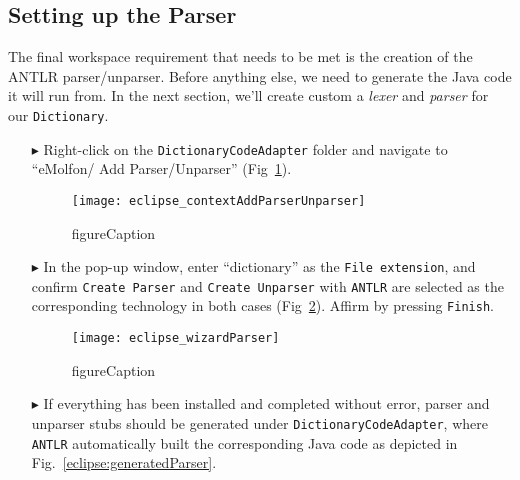 \newpage
\hypertarget{subSec:setupParser}{}
\subsection{Setting up the Parser}
\genHeader

The final workspace requirement that needs to be met is the creation of the ANTLR parser/unparser. Before anything else, we need to generate the Java code it
will run from. In the next section, we'll create custom a \emph{lexer} and \emph{parser} for our \texttt{Dictionary}.

\begin{itemize}

\item[$\blacktriangleright$] Right-click on the \texttt{DictionaryCodeAdapter} folder and navigate to ``eMolfon/ Add Parser/Unparser''
(Fig~\ref{eclipse:contextParser}).

\vspace{0.5cm}

\begin{figure}[htpb]
\begin{center}
  \texttt{[image: eclipse\_contextAddParserUnparser]}
  \caption{figureCaption}
  \label{eclipse:contextParser}
\end{center}
\end{figure}

\item[$\blacktriangleright$] In the pop-up window, enter ``dictionary'' as the \texttt{File extension}, and confirm \texttt{Create Parser} and \texttt{Create
Unparser} with \texttt{ANTLR} are selected as the corresponding technology in both cases (Fig~\ref{eclipse:wizardParser}). Affirm by pressing \texttt{Finish}.

\begin{figure}[htpb]
\begin{center}
  \texttt{[image: eclipse\_wizardParser]}
  \caption{figureCaption}
  \label{eclipse:wizardParser}
\end{center}
\end{figure}

\item[$\blacktriangleright$] If everything has been installed and completed without error, parser and unparser stubs should be generated under
\texttt{DictionaryCodeAdapter}, where \texttt{ANTLR} automatically built the corresponding Java code as depicted in Fig.~\ref{eclipse:generatedParser}.


\end{itemize}
